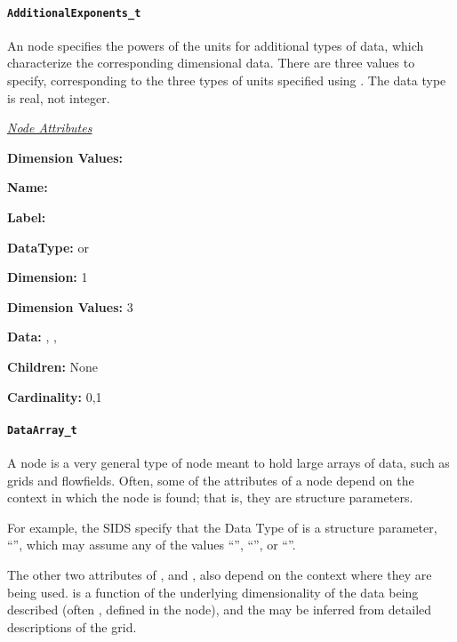 \paragraph{\texttt{AdditionalExponents\_t}}

An  node specifies the powers of the units
for additional types of data, which characterize the corresponding
dimensional data.
There are three values to specify, corresponding to the three types of
units specified using .
The data type is real, not integer.

\textit{\uline{Node Attributes}}
\begin{Ventryic}{\textbf{Dimension Values:}}
\raggedright
\item [\textbf{Name:}]
\item [\textbf{Label:}]
\item [\textbf{DataType:}]
       or 
\item [\textbf{Dimension:}]
      1
\item [\textbf{Dimension Values:}]
      3
\item [\textbf{Data:}]
      , ,
\item [\textbf{Children:}]
      None
\item [\textbf{Cardinality:}]
      0,1
\end{Ventryic}

\paragraph{\texttt{DataArray\_t}}

A  node is a very general type of node meant to hold
large arrays of data, such as grids and flowfields. Often, some of the
attributes of a  node depend on the context in which
the node is found; that is, they are structure parameters.

For example, the SIDS specify that the Data Type of 
is a structure parameter, ``'', which may assume
any of the values ``'', ``'',
or ``''.

The other two attributes of , 
and , also depend on the context where they are being used.
 is a function of the underlying dimensionality of
the data being described (often , defined in the
 node), and the  may be inferred from
detailed descriptions of the grid.

